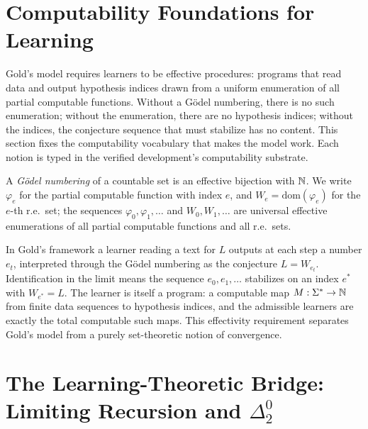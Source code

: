 
\section{Computability Foundations for Learning}
\label{sec:computability}

Gold's model requires learners to be effective procedures: programs that read data and output hypothesis indices drawn from a uniform enumeration of all partial computable functions. Without a G\"odel numbering, there is no such enumeration; without the enumeration, there are no hypothesis indices; without the indices, the conjecture sequence that must stabilize has no content. This section fixes the computability vocabulary that makes the model work. Each notion is typed in the verified development's computability substrate.

\begin{defn}
\label{def:godel-numbering}
A \emph{G\"odel numbering} of a countable set is an effective bijection with $\mathbb{N}$. We write $\varphi_e$ for the partial computable function with index $e$, and $W_e = \mathrm{dom}(\varphi_e)$ for the $e$-th r.e.\ set; the sequences $\varphi_0, \varphi_1, \ldots$ and $W_0, W_1, \ldots$ are universal effective enumerations of all partial computable functions and all r.e.\ sets.
\end{defn}

In Gold's framework a learner reading a text for $L$ outputs at each step a number $e_t$, interpreted through the G\"odel numbering as the conjecture $L = W_{e_t}$. Identification in the limit means the sequence $e_0, e_1, \ldots$ stabilizes on an index $e^\ast$ with $W_{e^\ast} = L$. The learner is itself a program: a computable map $M : \Sigma^\ast \to \mathbb{N}$ from finite data sequences to hypothesis indices, and the admissible learners are exactly the total computable such maps. This effectivity requirement separates Gold's model from a purely set-theoretic notion of convergence.


\section{The Learning-Theoretic Bridge: Limiting Recursion and $\Delta^0_2$}
\label{sec:bridge}

